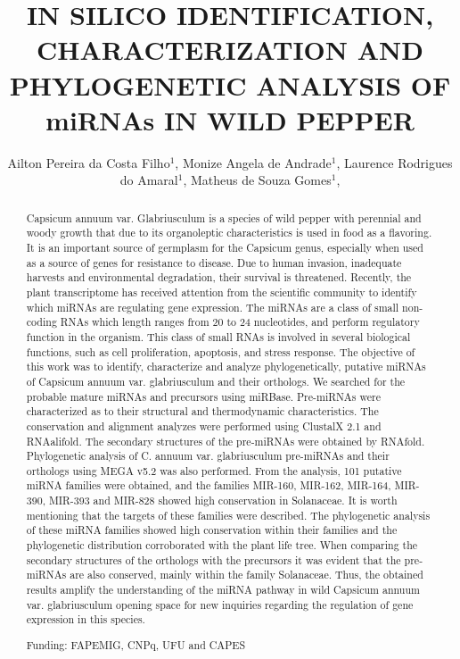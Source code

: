 \documentclass[twoside]{article}
\title{\vspace{-15mm}\fontsize{24pt}{10pt}\selectfont\textbf{ IN SILICO IDENTIFICATION, CHARACTERIZATION AND PHYLOGENETIC ANALYSIS OF miRNAs IN WILD PEPPER }} %
\author{ Ailton Pereira da Costa Filho$^{1}$, Monize Angela de Andrade$^{1}$, Laurence Rodrigues do Amaral$^{1}$, Matheus de Souza Gomes$^{1}$, }
\affil{ 1 UFU

 }
\date{}
\begin{document}
  
  
  \maketitle %
  
  
  \thispagestyle{fancy} %
  
  
  \begin{abstract}
  Capsicum annuum var. Glabriusculum is a species of wild pepper with perennial and woody growth that due to its organoleptic characteristics is used in food as a flavoring. It is an important source of germplasm for the Capsicum genus, especially when used as a source of genes for resistance to disease. Due to human invasion, inadequate harvests and environmental degradation, their survival is threatened. Recently, the plant transcriptome has received attention from the scientific community to identify which miRNAs are regulating gene expression. The miRNAs are a class of small non-coding RNAs which length ranges from 20 to 24 nucleotides, and perform regulatory function in the organism. This class of small RNAs is involved in several biological functions, such as cell proliferation, apoptosis, and stress response. The objective of this work was to identify, characterize and analyze phylogenetically, putative miRNAs of Capsicum annuum var. glabriusculum and their orthologs. We searched for the probable mature miRNAs and precursors using miRBase. Pre-miRNAs were characterized as to their structural and thermodynamic characteristics. The conservation and alignment analyzes were performed using ClustalX 2.1 and RNAalifold. The secondary structures of the pre-miRNAs were obtained by RNAfold. Phylogenetic analysis of C. annuum var. glabriusculum pre-miRNAs and their orthologs using MEGA v5.2 was also performed. From the analysis, 101 putative miRNA families were obtained, and the families MIR-160, MIR-162, MIR-164, MIR-390, MIR-393 and MIR-828 showed high conservation in Solanaceae. It is worth mentioning that the targets of these families were described. The phylogenetic analysis of these miRNA families showed high conservation within their families and the phylogenetic distribution corroborated with the plant life tree. When comparing the secondary structures of the orthologs with the precursors it was evident that the pre-miRNAs are also conserved, mainly within the family Solanaceae. Thus, the obtained results amplify the understanding of the miRNA pathway in wild Capsicum annuum var. glabriusculum opening space for new inquiries regarding the regulation of gene expression in this species.
  
  Funding: FAPEMIG, CNPq, UFU and CAPES \\ 
  \end{abstract}
  
\end{document}
